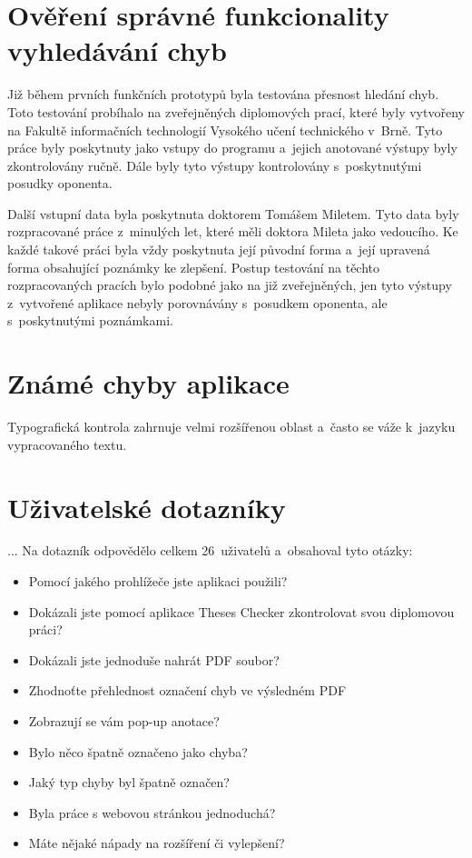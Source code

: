 \dummyShortText[10]


\section{Ověření správné funkcionality vyhledávání chyb}
Již během prvních funkčních prototypů byla testována přesnost hledání
chyb. Toto testování probíhalo na zveřejněných diplomových prací, které byly
vytvořeny na Fakultě informačních technologií Vysokého učení technického v~Brně.
Tyto práce byly poskytnuty jako vstupy do programu a~jejich anotované
výstupy byly zkontrolovány ručně. Dále byly tyto výstupy kontrolovány
s~poskytnutými posudky oponenta.

Další vstupní data byla poskytnuta doktorem Tomášem Miletem. Tyto data
byly rozpracované práce z~minulých let, které měli doktora Mileta jako
vedoucího. Ke každé takové práci byla vždy poskytnuta její původní forma
a~její upravená forma obsahující poznámky ke zlepšení. Postup testování
na těchto rozpracovaných pracích bylo podobné jako na již zveřejněných, 
jen tyto výstupy z~vytvořené aplikace nebyly porovnávány s~posudkem oponenta,
ale s~poskytnutými poznámkami.


\section{Známé chyby aplikace}
Typografická kontrola zahrnuje velmi rozšířenou oblast a~často se váže k~jazyku
vypracovaného textu.


\section{Uživatelské dotazníky}
... 
Na dotazník odpovědělo celkem 26~uživatelů a~obsahoval tyto otázky:
\begin{itemize}
    \item Pomocí jakého prohlížeče jste aplikaci použili?
    \item Dokázali jste pomocí aplikace Theses Checker zkontrolovat svou
    diplomovou práci?
    \item Dokázali jste jednoduše nahrát PDF soubor?
    \item Zhodnoťte přehlednost označení chyb ve výsledném PDF
    \item Zobrazují se vám pop-up anotace?
    \item Bylo něco špatně označeno jako chyba?
    \item Jaký typ chyby byl špatně označen?
    \item Byla práce s webovou stránkou jednoduchá?
    \item Máte nějaké nápady na rozšíření či vylepšení?
\end{itemize}

